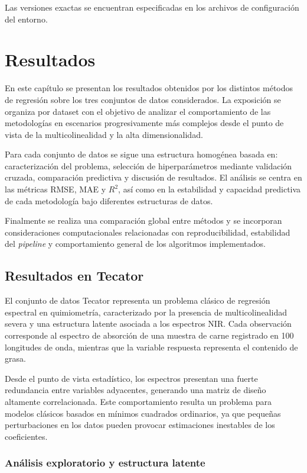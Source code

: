 \documentclass[12pt,a4paper]{report}
\begin{document}
Las versiones exactas se encuentran especificadas en los archivos de configuración del entorno.

\chapter{Resultados}

En este capítulo se presentan los resultados obtenidos por los distintos métodos de regresión sobre los tres conjuntos de datos considerados. La exposición se organiza por dataset con el objetivo de analizar el comportamiento de las metodologías en escenarios progresivamente más complejos desde el punto de vista de la multicolinealidad y la alta dimensionalidad.

Para cada conjunto de datos se sigue una estructura homogénea basada en: caracterización del problema, selección de hiperparámetros mediante validación cruzada, comparación predictiva y discusión de resultados. El análisis se centra en las métricas RMSE, MAE y $R^2$, así como en la estabilidad y capacidad predictiva de cada metodología bajo diferentes estructuras de datos.

Finalmente se realiza una comparación global entre métodos y se incorporan consideraciones computacionales relacionadas con reproducibilidad, estabilidad del \textit{pipeline} y comportamiento general de los algoritmos implementados.


\section{Resultados en Tecator}

El conjunto de datos Tecator representa un problema clásico de regresión espectral en quimiometría, caracterizado por la presencia de multicolinealidad severa y una estructura latente asociada a los espectros NIR. Cada observación corresponde al espectro de absorción de una muestra de carne registrado en 100 longitudes de onda, mientras que la variable respuesta representa el contenido de grasa.

Desde el punto de vista estadístico, los espectros presentan una fuerte redundancia entre variables adyacentes, generando una matriz de diseño altamente correlacionada. Este comportamiento resulta un problema para modelos clásicos basados en mínimos cuadrados ordinarios, ya que pequeñas perturbaciones en los datos pueden provocar estimaciones inestables de los coeficientes.

\subsection{Análisis exploratorio y estructura latente}
\end{document}
